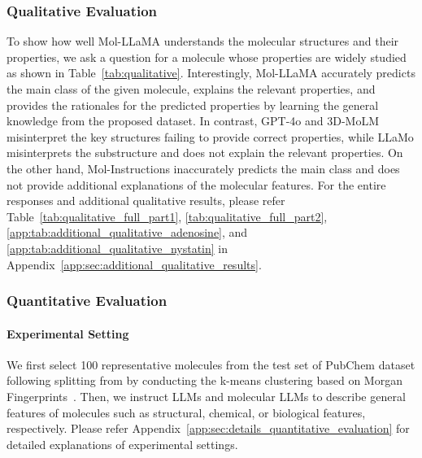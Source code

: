 \subsubsection{Qualitative Evaluation}
\vspace{-0.04in}
To show how well Mol-LLaMA understands the molecular structures and their properties, we ask a question for a molecule whose properties are widely studied as shown in Table~\ref{tab:qualitative}. Interestingly, Mol-LLaMA accurately predicts the main class of the given molecule, explains the relevant properties, and provides the rationales for the predicted properties by learning the general knowledge from the proposed dataset. In contrast, GPT-4o and 3D-MoLM misinterpret the key structures failing to provide correct properties, while LLaMo misinterprets the substructure and does not explain the relevant properties. On the other hand, Mol-Instructions inaccurately predicts the main class and does not provide additional explanations of the molecular features. For the entire responses and additional qualitative results, please refer Table~\ref{tab:qualitative_full_part1}, \ref{tab:qualitative_full_part2}, \ref{app:tab:additional_qualitative_adenosine}, and \ref{app:tab:additional_qualitative_nystatin} in Appendix~\ref{app:sec:additional_qualitative_results}. 



\vspace{-0.07in}
\subsubsection{Quantitative Evaluation\label{sec:quantitative}}
\vspace{-0.06in}
\paragraph{Experimental Setting}
We first select 100 representative molecules from the test set of PubChem dataset following splitting from \citet{li2024molm} by conducting the k-means clustering based on Morgan Fingerprints~\cite{morgan1965morgan}. Then, we instruct LLMs and molecular LLMs to describe general features of molecules such as structural, chemical, or biological features, respectively. Please refer Appendix~\ref{app:sec:details_quantitative_evaluation} for detailed explanations of experimental settings.


\vspace{-0.09in}
